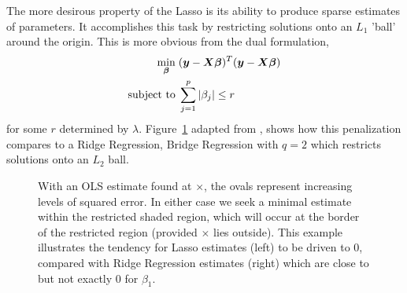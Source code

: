 \documentclass{uwstat572}
\begin{document}
The more desirous property of the Lasso is its ability to produce sparse estimates of parameters. It accomplishes this task by restricting solutions onto an $L_1$ 'ball' around the origin. This is more obvious from the dual formulation, 
\begin{align*}
\min_{\boldsymbol{\beta}}  \hspace{.1cm} &(\boldsymbol{y}-\boldsymbol{X}\boldsymbol{\beta})^T(\boldsymbol{y}-\boldsymbol{X}\boldsymbol{\beta})\\
\text{subject to} \hspace{.1cm}&\sum_{j=1}^p|\beta_j|\leq r
\end{align*}
for some $r$ determined by $\lambda$. Figure~\ref{LassoPlot} adapted from \cite{park2008bayesian}, shows how this penalization compares to a Ridge Regression, Bridge Regression with $q=2$ which restricts solutions onto an $L_2$ ball.

\begin{figure}\label{LassoPlot}
  \centering
  \caption{With an OLS estimate found at $\times$, the ovals represent increasing levels of squared error. In either case we seek a minimal estimate within the restricted shaded region, which will occur at the border of the restricted region (provided $\times$ lies outside). This example illustrates the tendency for Lasso estimates (left) to be driven to 0, compared with Ridge Regression estimates (right) which are close to but not exactly 0 for $\beta_1$.}
\end{figure}
\end{document}
